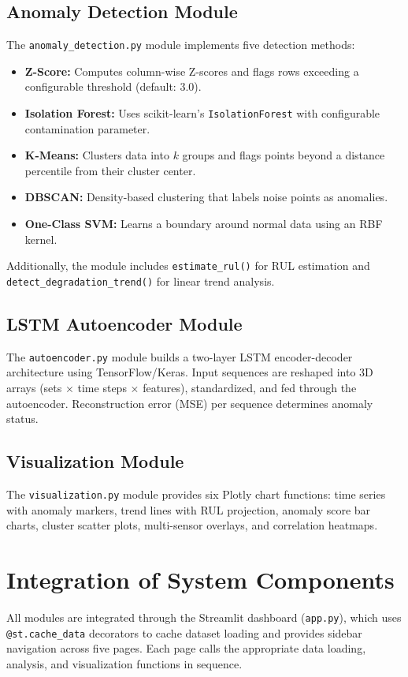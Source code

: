 \documentclass{CLS_zhou430}
\begin{document}
\subsection{Anomaly Detection Module}
The \texttt{anomaly\_detection.py} module implements five detection methods:
\begin{itemize}
    \item \textbf{Z-Score:} Computes column-wise Z-scores and flags rows exceeding a configurable threshold (default: 3.0).
    \item \textbf{Isolation Forest:} Uses scikit-learn's \texttt{IsolationForest} with configurable contamination parameter.
    \item \textbf{K-Means:} Clusters data into $k$ groups and flags points beyond a distance percentile from their cluster center.
    \item \textbf{DBSCAN:} Density-based clustering that labels noise points as anomalies.
    \item \textbf{One-Class SVM:} Learns a boundary around normal data using an RBF kernel.
\end{itemize}
Additionally, the module includes \texttt{estimate\_rul()} for RUL estimation and \texttt{detect\_degradation\_trend()} for linear trend analysis.

\subsection{LSTM Autoencoder Module}
The \texttt{autoencoder.py} module builds a two-layer LSTM encoder-decoder architecture using TensorFlow/Keras. Input sequences are reshaped into 3D arrays (sets $\times$ time steps $\times$ features), standardized, and fed through the autoencoder. Reconstruction error (MSE) per sequence determines anomaly status.

\subsection{Visualization Module}
The \texttt{visualization.py} module provides six Plotly chart functions: time series with anomaly markers, trend lines with RUL projection, anomaly score bar charts, cluster scatter plots, multi-sensor overlays, and correlation heatmaps.

\section{Integration of System Components}
All modules are integrated through the Streamlit dashboard (\texttt{app.py}), which uses \texttt{@st.cache\_data} decorators to cache dataset loading and provides sidebar navigation across five pages. Each page calls the appropriate data loading, analysis, and visualization functions in sequence.
\end{document}
